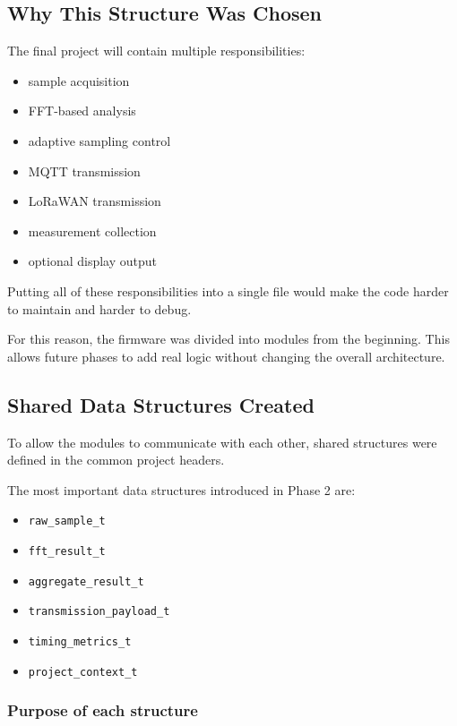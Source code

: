 \documentclass[12pt,a4paper]{article}
\begin{document}
\subsection{Why This Structure Was Chosen}

The final project will contain multiple responsibilities:

\begin{itemize}
    \item sample acquisition
    \item FFT-based analysis
    \item adaptive sampling control
    \item MQTT transmission
    \item LoRaWAN transmission
    \item measurement collection
    \item optional display output
\end{itemize}

Putting all of these responsibilities into a single file would make the code
harder to maintain and harder to debug.

For this reason, the firmware was divided into modules from the beginning. This
allows future phases to add real logic without changing the overall
architecture.

\subsection{Shared Data Structures Created}

To allow the modules to communicate with each other, shared structures were
defined in the common project headers.

The most important data structures introduced in Phase 2 are:

\begin{itemize}
    \item \texttt{raw\_sample\_t}
    \item \texttt{fft\_result\_t}
    \item \texttt{aggregate\_result\_t}
    \item \texttt{transmission\_payload\_t}
    \item \texttt{timing\_metrics\_t}
    \item \texttt{project\_context\_t}
\end{itemize}

\subsubsection*{Purpose of each structure}
\end{document}

